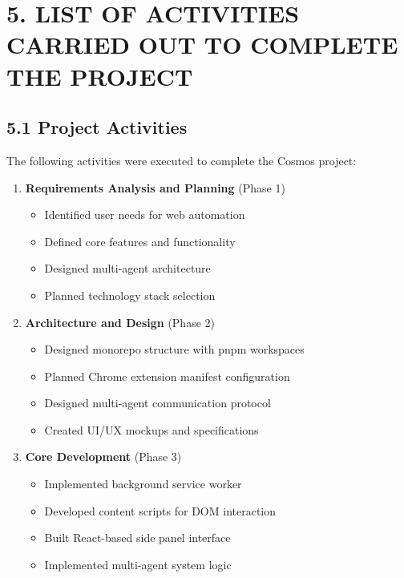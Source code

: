 \documentclass[12pt,a4paper]{article}
\begin{document}
\vspace{0.5cm}

\section*{\textbf{5. LIST OF ACTIVITIES CARRIED OUT TO COMPLETE THE PROJECT}}

\subsection*{\textbf{5.1 Project Activities}}

The following activities were executed to complete the Cosmos project:

\begin{enumerate}
    \item \textbf{Requirements Analysis and Planning} (Phase 1)
    \begin{itemize}
        \item Identified user needs for web automation
        \item Defined core features and functionality
        \item Designed multi-agent architecture
        \item Planned technology stack selection
    \end{itemize}
    
    \item \textbf{Architecture and Design} (Phase 2)
    \begin{itemize}
        \item Designed monorepo structure with pnpm workspaces
        \item Planned Chrome extension manifest configuration
        \item Designed multi-agent communication protocol
        \item Created UI/UX mockups and specifications
    \end{itemize}
    
    \item \textbf{Core Development} (Phase 3)
    \begin{itemize}
        \item Implemented background service worker
        \item Developed content scripts for DOM interaction
        \item Built React-based side panel interface
        \item Implemented multi-agent system logic
    \end{itemize}
    

\end{enumerate}
\end{document}
